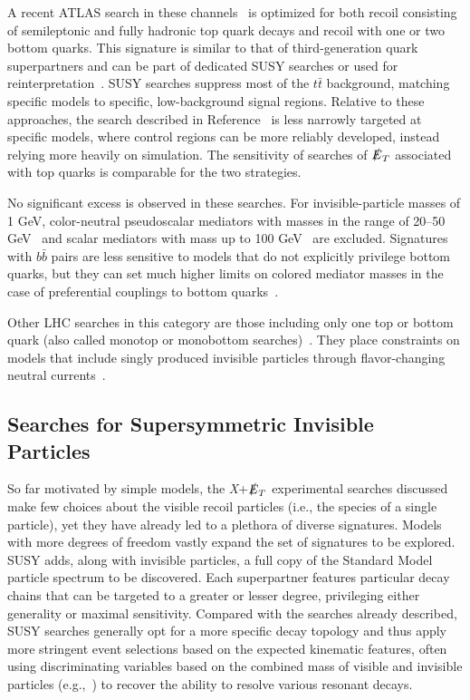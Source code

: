 \documentclass{ar-1col}
\newcommand{\IP}{invisible particle}
\newcommand{\MET}{\ensuremath{\slashed{E}_T}\xspace}
\begin{document}
A recent ATLAS search in these channels~\cite{Aaboud:2017rzf} is
optimized for both recoil consisting of semileptonic and fully
hadronic top quark decays and recoil with one or two bottom
quarks. This signature is similar to that of third-generation
quark superpartners and can be part of dedicated SUSY searches or
used for reinterpretation~\cite{Aaboud:2017aeu,Sirunyan:2017leh}.
SUSY searches suppress most of the $t\bar{t}$ background, matching
specific models to specific, low-background signal regions.
Relative to these approaches, the search described in
Reference~ is less narrowly targeted at specific
models, where control regions can be more reliably developed,
instead relying more heavily on simulation. The sensitivity of
searches of \MET associated with top quarks is comparable for the
two strategies.

No significant excess is observed in these searches. For invisible-particle masses of
1 GeV, color-neutral pseudoscalar mediators with masses in the range of 20--50
GeV~\cite{Aaboud:2017aeu} and scalar mediators with mass up to 100
GeV~\cite{Sirunyan:2017leh} are excluded. Signatures with
$b\bar{b}$ pairs are less sensitive to models that do not
explicitly privilege bottom quarks, but they can set much higher limits
on colored mediator masses in the case of preferential couplings to
bottom quarks~\cite{Agrawal:2014una}.

Other LHC searches in this category are those including only
one top or bottom quark (also called monotop or monobottom
searches)~\cite{Sirunyan:2018gka, Aad:2014wza}. They place
constraints on models that include singly produced {\IP}s through
flavor-changing neutral currents~\cite{Boucheneb:2014wza}.

\subsection{Searches for Supersymmetric Invisible Particles}\label{sec:results_SUSYSearches}

So far motivated by simple models, the \textit{X}+\MET experimental
searches discussed make few choices about the visible recoil
particles (i.e., the species of a single particle), yet they have
already led to a plethora of diverse signatures. Models with more degrees of freedom vastly expand the set of
signatures to be explored. SUSY adds, along with
{\IP}s, a full copy of the Standard Model particle
spectrum to be discovered. Each superpartner features particular decay chains that
can be targeted to a greater or lesser degree, privileging either
generality or maximal sensitivity. Compared with the 
searches already described, SUSY searches generally opt for a more specific
decay topology and thus apply more stringent event selections
based on the expected kinematic features, often using
discriminating variables based on the combined mass of visible and
invisible particles (e.g.,~) to recover
the ability to resolve various resonant decays.
\end{document}
